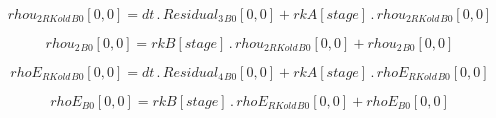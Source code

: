 \documentclass{article}
\begin{document}
\begin{dmath}{rhou_{2 RKold}{_{B0}}}[{0,0}] = dt \,.\, {Residual_{3}{_{B0}}}[{0,0}] + {rkA}[{stage}] \,.\, {rhou_{2 RKold}{_{B0}}}[{0,0}]\end{dmath}

\begin{dmath}{rhou_{2}{_{B0}}}[{0,0}] = {rkB}[{stage}] \,.\, {rhou_{2 RKold}{_{B0}}}[{0,0}] + {rhou_{2}{_{B0}}}[{0,0}]\end{dmath}

\begin{dmath}{rhoE_{RKold}{_{B0}}}[{0,0}] = dt \,.\, {Residual_{4}{_{B0}}}[{0,0}] + {rkA}[{stage}] \,.\, {rhoE_{RKold}{_{B0}}}[{0,0}]\end{dmath}

\begin{dmath}{rhoE{_{B0}}}[{0,0}] = {rkB}[{stage}] \,.\, {rhoE_{RKold}{_{B0}}}[{0,0}] + {rhoE{_{B0}}}[{0,0}]\end{dmath}
\end{document}
